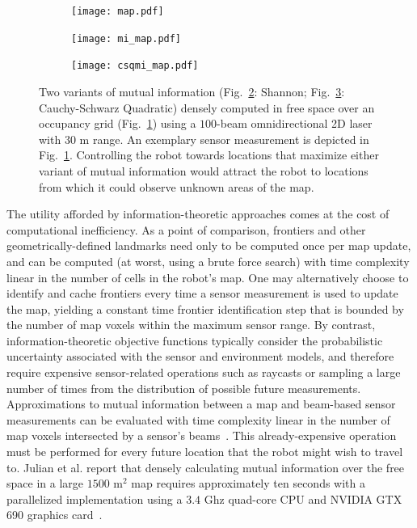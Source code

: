 \begin{figure}[t]
    \centering
    \begin{subfigure}[t]{0.31\textwidth}
        \centering
        \texttt{[image: map.pdf]}
        \caption{\label{fig:og}}
    \end{subfigure}
    \begin{subfigure}[t]{0.31\textwidth}
        \centering
        \texttt{[image: mi\_map.pdf]}
        \caption{\label{fig:og_mi}}
    \end{subfigure}
    \begin{subfigure}[t]{0.31\textwidth}
        \centering
        \texttt{[image: csqmi\_map.pdf]}
        \caption{\label{fig:og_csqmi}}
    \end{subfigure}
    \caption{Two variants of mutual information (Fig.~\ref{fig:og_mi}: Shannon;
    Fig.~\ref{fig:og_csqmi}: Cauchy-Schwarz Quadratic) densely computed in free space
  over an occupancy grid (Fig.~\ref{fig:og}) using a $100$-beam omnidirectional 2D
laser with $30$ m range. An exemplary sensor measurement is depicted in
Fig.~\ref{fig:og}. Controlling the robot towards locations that maximize either variant
of mutual information would attract the robot to locations from which it
could observe unknown areas of the map. \label{fig:mi_vs_csqmi}}
\end{figure}

The utility afforded by information-theoretic approaches comes at the cost of
computational inefficiency.
As a point of comparison, frontiers and other geometrically-defined landmarks
need only to be computed once per map update, and can be computed (at worst, using a brute force search)
with time complexity linear in the number of cells in the robot's map.
One may alternatively choose to identify and cache frontiers every time a sensor
measurement is used to update the map, yielding a constant time frontier
identification step that is bounded by the number of map voxels within the maximum sensor range.
By contrast, information-theoretic objective functions typically consider the probabilistic
uncertainty associated with the sensor and environment models, and therefore
require expensive sensor-related operations such as raycasts or sampling a large
number of times from the distribution of possible future measurements.
Approximations to mutual information between a map and beam-based sensor
measurements can be evaluated with time complexity linear in the number of map
voxels intersected by a sensor's
beams~\cite{julian2013mutualthesis,charrow2015icra,nelson2015iros}. This
already-expensive operation must be performed for every future location that the
robot might wish to travel to. Julian et al. report that densely calculating
mutual information over the free space in a large $1500$ m$^{2}$ map requires
approximately ten seconds with a parallelized implementation using a $3.4$ Ghz
quad-core CPU and NVIDIA GTX 690 graphics card~\cite{julian2013mutual}.

